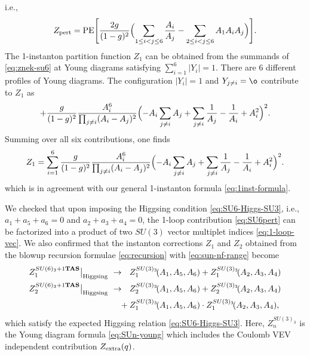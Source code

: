 \documentclass[letterpaper, 11pt]{article}
\begin{document}
{i.e., 
\begin{align}
  \label{eq:SU6pert}
  Z_{\rm pert}  = \text{PE} \Biggl[ 
    \frac{2g}{(1-g)^2} 
    \Bigl(\sum_{1\leq i<j \leq 6}  \frac{A_i}{A_j} 
    - \sum_{2\leq i<j \leq 6} A_1 A_i  A_j %
    \Bigr)
    \Biggr].
\end{align}
The 1-instanton partition function $Z_1$ can be obtained from the summands of \eqref{eq:znek-su6} at Young diagrams satisfying $\sum_{i=1}^6 |Y_i|=1$. There are 6 different profiles of Young diagrams. The configuration $|Y_i| = 1$ and %
$Y_{j\neq i} = \o$ contribute to $Z_{1}$ as
\begin{align}
  + \frac{g}{(1-g)^2} \frac{A_i^6}{\prod_{j \neq i} (A_i - A_j)^2} 
  \Bigl(-A_i \sum_{j\neq i} A_j +  \sum_{j\neq i}\frac{1}{A_j}  - \frac{1}{A_i} + A_i^2
 \Bigr)^2. 
\end{align}
Summing over all six contributions, one finds
\begin{align}
  Z_1 = \sum_{i=1}^6 \frac{g}{(1-g)^2} \frac{A_i^6}{\prod_{j \neq i} (A_i - A_j)^2} 
  \Bigl(-A_i \sum_{j\neq i} A_j +  \sum_{j\neq i}\frac{1}{A_j}  - \frac{1}{A_i} + A_i^2
 \Bigr)^2. 
\end{align}
which is in agreement with our general 1-instanton formula \eqref{eq:1inst-formula}.

We checked that upon imposing the Higgsing condition \eqref{eq:SU6-Higgs-SU3}, i.e., $a_1 + a_5 + a_6 = 0$ and $a_2 + a_3 + a_4 = 0$, the 1-loop contribution \eqref{eq:SU6pert} can be factorized into a product of two $SU(3)$ vector multiplet indices \eqref{eq:1-loop-vec}. We also confirmed that the instanton corrections $Z_1$ and $Z_2$ obtained from the blowup recursion formulae \eqref{eq:recursion} with \eqref{eq:sun-nf-range} become
\begin{align}
  \begin{split}
  Z_1^{SU(6)_{3}+1{\bf TAS}}\big|_{\rm Higgsing}~&\rightarrow ~~ Z_1^{SU(3)_{3}}
  \!(A_1, A_5,A_6)+Z_1^{SU(3)_{3}}\!(A_2, A_3,A_4)\\
  Z_2^{SU(6)_{3}+1{\bf TAS}}\big|_{\rm Higgsing}~&\rightarrow ~~ Z_2^{SU(3)_{3}}\!(A_1, A_5,A_6)+Z_2^{SU(3)_{3}}\!(A_2, A_3,A_4) \\
  &\quad+ Z_1^{SU(3)_{3}}\!(A_1, A_5,A_6)\cdot Z_1^{SU(3)_{3}}\!(A_2, A_3,A_4),
  \end{split}
\end{align}
which satisfy the expected Higgsing relation \eqref{eq:SU6-Higgs-SU3}. Here, $Z_n^{SU(3)_3}$ is the Young
diagram formula \eqref{eq:SUn-young} which includes the Coulomb VEV independent contribution $Z_{\rm extra}(q)$.


}
\end{document}
